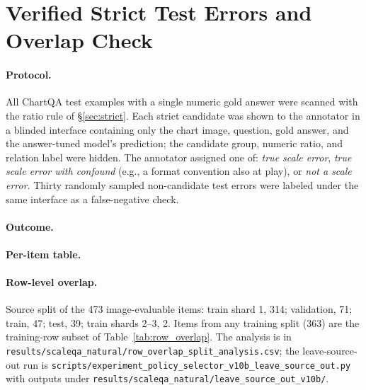\section{Verified Strict Test Errors and Overlap Check}
\label{app:strict_verified}

\paragraph{Protocol.}
All ChartQA test examples with a single numeric gold answer were scanned with the ratio rule of \S\ref{sec:strict}. Each strict candidate was shown to the annotator in a blinded interface containing only the chart image, question, gold answer, and the answer-tuned model's prediction; the candidate group, numeric ratio, and relation label were hidden. The annotator assigned one of: \emph{true scale error}, \emph{true scale error with confound} (e.g., a format convention also at play), or \emph{not a scale error}. Thirty randomly sampled non-candidate test errors were labeled under the same interface as a false-negative check.

\paragraph{Outcome.}
 

\paragraph{Per-item table.}

\paragraph{Row-level overlap.}
\label{app:overlap}
Source split of the 473 image-evaluable items: train shard 1, 314; validation, 71; train, 47; test, 39; train shards 2--3, 2. Items from any training split (363) are the training-row subset of Table~\ref{tab:row_overlap}. The analysis is in \texttt{results/scaleqa\_natural/row\_overlap\_split\_analysis.csv}; the leave-source-out run is \texttt{scripts/experiment\_policy\_selector\_v10b\_leave\_source\_out.py} with outputs under \texttt{results/scaleqa\_natural/leave\_source\_out\_v10b/}.

